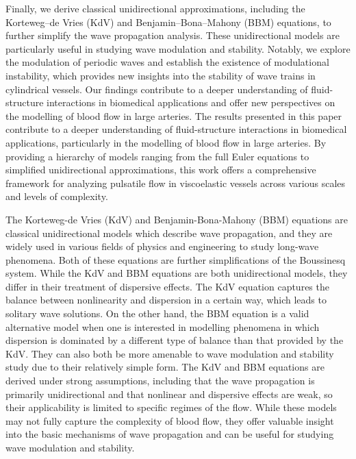 \documentclass[alpha-refs, 12pt]{wiley-article}
\begin{document}
Finally, we derive classical unidirectional approximations, including the Korteweg--de Vries (KdV) and Benjamin--Bona--Mahony (BBM) equations, to further simplify the wave propagation analysis. These unidirectional models are particularly useful in studying wave modulation and stability. Notably, we explore the modulation of periodic waves and establish the existence of modulational instability, which provides new insights into the stability of wave trains in cylindrical vessels. Our findings contribute to a deeper understanding of fluid-structure interactions in biomedical applications and offer new perspectives on the modelling of blood flow in large arteries. The results presented in this paper contribute to a deeper understanding of fluid-structure interactions in biomedical applications, particularly in the modelling of blood flow in large arteries. By providing a hierarchy of models ranging from the full Euler equations to simplified unidirectional approximations, this work offers a comprehensive framework for analyzing pulsatile flow in viscoelastic vessels across various scales and levels of complexity.

The Korteweg-de Vries (KdV) and Benjamin-Bona-Mahony (BBM) equations are classical unidirectional models which describe wave propagation, and they are widely used in various fields of physics and engineering to study long-wave phenomena. Both of these equations are further simplifications of the Boussinesq system. While the KdV and BBM equations are both unidirectional models, they differ in their treatment of dispersive effects. The KdV equation captures the balance between nonlinearity and dispersion in a certain way, which leads to solitary wave solutions. On the other hand, the BBM equation is a valid alternative model when one is interested in modelling phenomena in which dispersion is dominated by a different type of balance than that provided by the KdV. They can also both be more amenable to wave modulation and stability study due to their relatively simple form. The KdV and BBM equations are derived under strong assumptions, including that the wave propagation is primarily unidirectional and that nonlinear and dispersive effects are weak, so their applicability is limited to specific regimes of the flow. While these models may not fully capture the complexity of blood flow, they offer valuable insight into the basic mechanisms of wave propagation and can be useful for studying wave modulation and stability.
\end{document}
